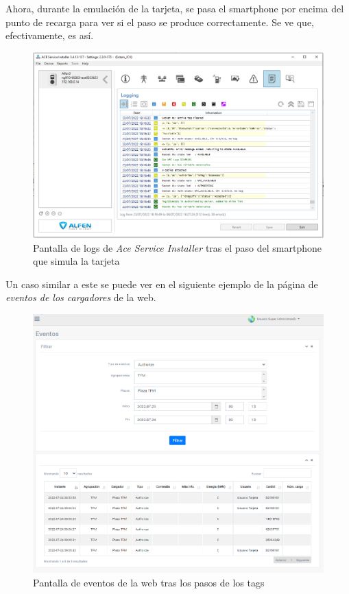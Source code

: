 \documentclass[12pt,a4paper,onecolumn,oneside]{report}
\begin{document}
Ahora, durante la emulación de la tarjeta, se pasa el smartphone por encima del punto de recarga para ver si el paso se produce correctamente. Se ve que, efectivamente, es así.


\begin{figure}[h] 
\centering
  \includegraphics[width=1\textwidth]{figuras/authorize2.png}
  \caption[Pantalla de logs de \textit{Ace Service Installer} tras el paso del smartphone que simula la tarjeta]{Pantalla de logs de \textit{Ace Service Installer} tras el paso del smartphone que simula la tarjeta\\
  }
  \label{fig:authorize2}
\end{figure}


Un caso similar a este se puede ver en el siguiente ejemplo de la página de \textit{eventos de los cargadores} de la web.

\begin{figure}[h] 
\centering
  \includegraphics[width=1\textwidth]{figuras/authorize3.png}
  \caption[Pantalla de eventos de la web tras los pasos de los tags]{Pantalla de eventos de la web tras los pasos de los tags\\
  }
  \label{fig:authorize3}
\end{figure}
\end{document}
